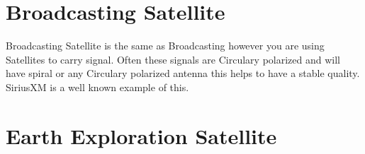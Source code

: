 \documentclass{book}
\begin{document}
    \section{Broadcasting Satellite}
        Broadcasting Satellite is the same as Broadcasting however you are using Satellites to carry signal. Often these signals are Circulary polarized and will have spiral or any Circulary polarized antenna
        this helps to have a stable quality. SiriusXM is a well known example of this.
    \section{Earth Exploration Satellite}
\end{document}
